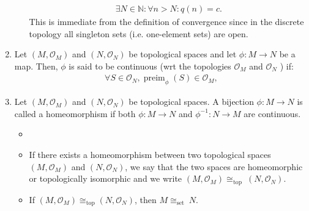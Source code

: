 \documentclass{article}
\begin{document}
\begin{enumerate}
\begin{itemize}
\begin{align*}
\exists N \in \mathbb{N}: \forall n>N: q(n)=c .
\end{align*}
This is immediate from the definition of convergence since in the discrete topology all singleton sets (i.e. one-element sets) are open.
\end{itemize}
\item {} Let $\left(M, \mathcal{O}_{M}\right)$ and $\left(N, \mathcal{O}_{N}\right)$ be topological spaces and let $\phi: M \rightarrow N$ be a map. Then, $\phi$ is said to be continuous (\gls{wrt} the topologies $\mathcal{O}_{M}$ and $\mathcal{O}_{N}$ ) if:
\begin{align*}
\forall S \in \mathcal{O}_{N}, \operatorname{preim}_{\phi}(S) \in \mathcal{O}_{M},
\end{align*}

\item {}  Let $\left(M, \mathcal{O}_{M}\right)$ and $\left(N, \mathcal{O}_{N}\right)$ be topological spaces. A bijection $\phi: M \rightarrow N$ is called a homeomorphism if both $\phi: M \rightarrow N$ and $\phi^{-1}: N \rightarrow M$ are continuous.
\begin{itemize}
    \item {}
    \item If there exists a homeomorphism between two topological spaces $\left(M, \mathcal{O}_{M}\right)$ and $\left(N, \mathcal{O}_{N}\right)$, we say that the two spaces are homeomorphic or topologically isomorphic and we write $\left(M, \mathcal{O}_{M}\right) \cong_{\text {top }}\left(N, \mathcal{O}_{N}\right)$.
    \item If $\left(M, \mathcal{O}_{M}\right) \cong_{\text{top}} \left(N, \mathcal{O}_{N}\right)$, then $M\cong_{\text {set }} N$.
\end{itemize} 
\end{enumerate}
\end{document}
